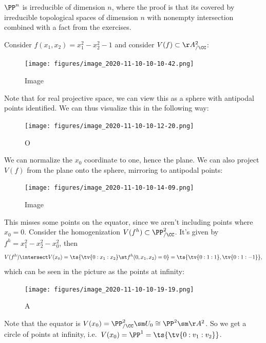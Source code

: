 \begin{corollary}[?]

\(\PP^n\) is irreducible of dimension \(n\), where the proof is that its
covered by irreducible topological spaces of dimension \(n\) with
nonempty intersection combined with a fact from the exercises.

\end{corollary}

\begin{example}[?]

Consider \(f(x_1, x_2) = x_1^2 - x_2^2 - 1\) and consider
\(V(f) \subset \AA^2_{/\CC}\):

\begin{figure}
\centering
\texttt{[image: figures/image\_2020-11-10-10-10-42.png]}
\caption{Image}
\end{figure}

Note that for real projective space, we can view this as a sphere with
antipodal points identified. We can thus visualize this in the following
way:

\begin{figure}
\centering
\texttt{[image: figures/image\_2020-11-10-10-12-20.png]}
\caption{O}
\end{figure}

We can normalize the \(x_0\) coordinate to one, hence the plane. We can
also project \(V(f)\) from the plane onto the sphere, mirroring to
antipodal points:

\begin{figure}
\centering
\texttt{[image: figures/image\_2020-11-10-10-14-09.png]}
\caption{Image}
\end{figure}

This misses some points on the equator, since we aren't including points
where \(x_0 = 0\). Consider the homogenization
\(V(f^h) \subset \PP^2_{/\CC}\). It's given by
\(f^h = x_1^2 - x_2^2 - x_0^2\), then
\begin{align*}  
V(f^h) \intersect V(x_0) = \ts{\tv{0:x_1:x_2} \st f^h(0, x_1, x_2) = 0 } = \ts{\tv{0:1:1}, \tv{0:1:-1}}
,\end{align*} which can be seen in the picture as the points at
infinity:

\begin{figure}
\centering
\texttt{[image: figures/image\_2020-11-10-10-19-19.png]}
\caption{A}
\end{figure}

Note that the equator is
\(V(x_0) = \PP^2_{/\CC}\sm U_0 \cong \PP^2\sm \AA^2\). So we get a
circle of points at infinity,
i.e.~\(V(x_0) = \PP^1 = \ts{\tv{0:v_1:v_2}}\).

\end{example}

